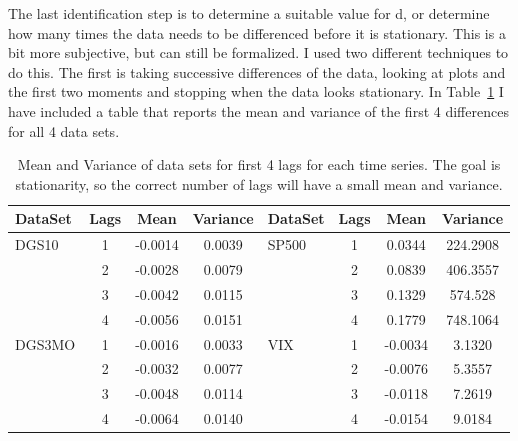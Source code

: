 \documentclass[a4paper, 11pt, twoside]{article}
\theoremstyle{definition} %
\numberwithin{equation}{section}
\begin{document}
      The last identification step is to determine a suitable value for d, or determine how many times the data needs to be differenced before it is stationary. This is a bit more subjective, but can still be formalized. I used two different techniques to do this. The first is taking successive differences of the data, looking at plots and the first two moments and stopping when the data looks stationary.  In Table~\ref{tab:differences} I have included a table that reports the mean and variance of the first 4 differences for all 4 data sets.

      \begin{table}[h!]
        \begin{centering}
        \begin{tabular}{|l|c|cc||l|c|cc|}
          \hline
           \rowcolor{gray!45} DataSet & Lags &   Mean &     Variance & DataSet & Lags &   Mean &     Variance \\
          \hline
          \hline
           \rowcolor{gray!7} DGS10  & 1    & -0.0014 &  0.0039 & SP500  & 1    &   0.0344 &  224.2908 \\
           \rowcolor{gray!23} {} &     2    & -0.0028 &  0.0079 & {} &     2    &   0.0839 &  406.3557 \\
           \rowcolor{gray!7} {} &     3    &  -0.0042 &   0.0115 & {} &      3    &    0.1329 &   574.528 \\
           \rowcolor{gray!23} {} &     4    & -0.0056 &   0.0151 & {} &     4    &    0.1779 &  748.1064 \\
           \rowcolor{gray!7} DGS3MO &  1    & -0.0016 &  0.0033 & VIX    & 1    & -0.0034 &   3.1320 \\
           \rowcolor{gray!23} {} &     2    & -0.0032 &  0.0077 & {} &     2    & -0.0076 &  5.3557 \\
           \rowcolor{gray!7} {} &     3    &  -0.0048 &   0.0114 & {} &     3    &  -0.0118 &  7.2619 \\
           \rowcolor{gray!23} {} &     4    & -0.0064 &   0.0140 & {} &     4    &  -0.0154 &  9.0184 \\
          \hline
        \end{tabular}
        \captionsetup{width=5.5in}
        \caption{Mean and Variance of data sets for first 4 lags for each time series. The goal is stationarity, so the correct number of lags will have a small mean and variance.}
        \label{tab:differences}
        \end{centering}
      \end{table}
\end{document}
